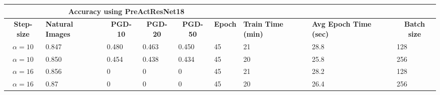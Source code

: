 \documentclass{article}
\begin{document}
\begin{center}
\begin{table}[hbt!]
\begin{tabular}{|c|l|l|l|l|l|l|l|l|}
\hline
\multicolumn{1}{|l|}{{ }} & \multicolumn{4}{c|}{{ \textbf{Accuracy using PreActResNet18}}}                                                                                                                                                                            & \multicolumn{4}{l|}{{ }}                                                                                                                                                                                                                         \\ \hline
{ \textbf{Step-size}}     & \multicolumn{1}{p{1.5cm}|}{{ \textbf{Natural Images}}} & \multicolumn{1}{c|}{{ \textbf{PGD-10}}} & \multicolumn{1}{c|}{{ \textbf{PGD-20}}} & \multicolumn{1}{c|}{{ \textbf{PGD-50}}} & \multicolumn{1}{c|}{{ \textbf{Epoch}}} & \multicolumn{1}{p{1.5cm}|}{{ \textbf{Train Time (min)}}} & \multicolumn{1}{p{1.5cm}|}{{ \textbf{Avg Epoch Time (sec)}}} & \multicolumn{1}{c|}{{ \textbf{Batch size}}} \\ \hline
{ $\alpha = 10$}       & { 0.847}                                        & { 0.480}                                & { 0.463}                                & { 0.450}                                & { 45}                                  & { 21 }                               & { 28.8 }                                & { 128}                                      \\ \hline
{ $\alpha = 10$}       & { 0.850}                                        & { 0.454}                                & { 0.438}                                & { 0.434}                                & { 45}                                  & { 20 }                               & { 25.8 }                                 & { 256}                                      \\ \hline
{ $\alpha = 16$}       & { 0.856}                                        & { 0}                                    & { 0}                                    & { 0}                                    & { 45}                                  & { 21 }                               & { 28.2 }                                 & { 128}                                      \\ \hline
{ $\alpha = 16$}       & { 0.87}                                         & { 0}                                    & { 0}                                    & { 0}                                    & { 45}                                  & { 20 }                               & { 26.4 }                                 & { 256}                                      \\ \hline
\end{tabular}
\end{table}
\end{center}
\end{document}
